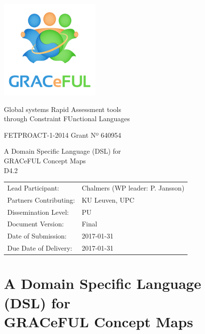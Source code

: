 \documentclass[]{article}
\author{}
\date{}
\begin{document}
\begin{center}
\includegraphics[width=5cm]{../coverpage/GRACeFULlogo.png}

\textcolor{GRACeFULblue}{Global systems Rapid Assessment tools\\
through Constraint FUnctional Languages}

\vspace{1cm}

FETPROACT-1-2014 Grant Nº 640954

\end{center}

\begin{framed}
\begin{center}
\Large
A Domain Specific Language (DSL) for \\
GRACeFUL Concept Maps\\[1ex]

D4.2\\[1ex]

\end{center}
\end{framed}

\vspace{1cm}

\noindent
\begin{tabular}{@{}ll@{}}
  Lead Participant:       & Chalmers (WP leader: P. Jansson)
\\Partners Contributing:  & KU Leuven, UPC
\\Dissemination Level:    & PU
\\Document Version:       & Final
\\Date of Submission:     & 2017-01-31
\\Due Date of Delivery:   & 2017-01-31
\end{tabular}

\newpage

\section*{A Domain Specific Language (DSL) for\\
GRACeFUL Concept Maps}\label{DSL4GRACeFUL}
\end{document}
